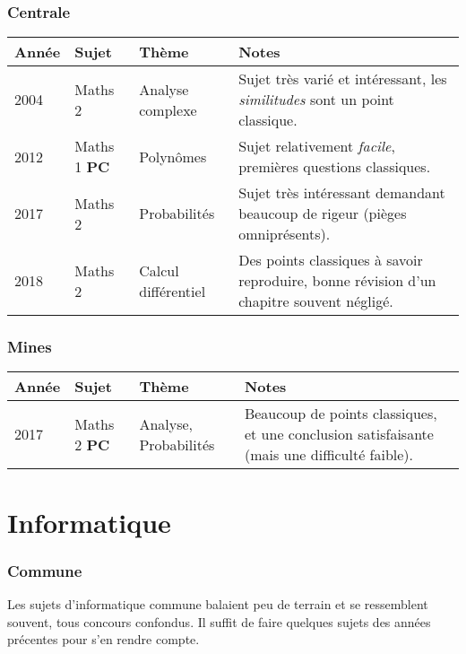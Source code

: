 \documentclass{article}
\begin{document}
\section{Centrale}

\begin{tabular}{ |p{1cm} | p{2cm} | p{3cm} | p{8cm}| }
 Année  &  Sujet            &  Thème                                &  Notes \\
\hline\hline

 2004   &  Maths 2          &  Analyse complexe                     &  Sujet très varié et intéressant, les \textit{similitudes} sont un point classique. \\\hline

 2012   &  Maths 1 \textbf{PC}   &  Polynômes                            &  Sujet relativement \textit{facile}, premières questions classiques. \\\hline

 2017   &  Maths 2          &  Probabilités                         &  Sujet très intéressant demandant beaucoup de rigeur (pièges omniprésents). \\\hline

 2018   &  Maths 2          &  Calcul différentiel                  &  Des points classiques à savoir reproduire, bonne révision d'un chapitre souvent négligé. \\\hline

\end{tabular}

\section{Mines}

\begin{tabular}{ |p{1cm} | p{2cm} | p{3cm} | p{8cm}| }
 Année  &  Sujet            &  Thème                                &  Notes \\
\hline\hline

 2017   &  Maths 2 \textbf{PC}   &  Analyse, Probabilités                &  Beaucoup de points classiques, et une conclusion satisfaisante (mais une difficulté faible). \\\hline

\end{tabular}

\part{Informatique}
\section{Commune}
Les sujets d'informatique commune balaient peu de terrain et se ressemblent souvent, tous concours confondus.
Il suffit de faire quelques sujets des années précentes pour s'en rendre compte.
\end{document}
